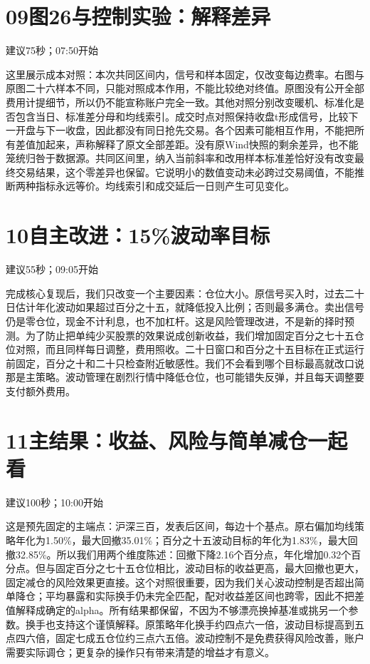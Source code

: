 \documentclass[UTF8,a4paper,11pt]{ctexart}
\begin{document}
\section*{\color{ink}09\quad 图26与控制实验：解释差异}
{\small\color{accent}建议75秒；07:50开始}\par
这里展示成本对照：本次共同区间内，信号和样本固定，仅改变每边费率。右图与原图二十六样本不同，只能对照成本作用，不能比较绝对终值。原图没有公开全部费用计提细节，所以仍不能宣称账户完全一致。其他对照分别改变暖机、标准化是否包含当日、标准差分母和均线索引。成交时点对照保持收盘t形成信号，比较下一开盘与下一收盘，因此都没有同日抢先交易。各个因素可能相互作用，不能把所有差值加起来，声称解释了原文全部差距。没有原Wind快照的剩余差异，也不能笼统归咎于数据源。共同区间里，纳入当前斜率和改用样本标准差恰好没有改变最终交易结果，这个零差异也保留。它说明小的数值变动未必跨过交易阈值，不能推断两种指标永远等价。均线索引和成交延后一日则产生可见变化。
\section*{\color{ink}10\quad 自主改进：15\%波动率目标}
{\small\color{accent}建议55秒；09:05开始}\par
完成核心复现后，我们只改变一个主要因素：仓位大小。原信号买入时，过去二十日估计年化波动如果超过百分之十五，就降低投入比例；否则最多满仓。卖出信号仍是零仓位，现金不计利息，也不加杠杆。这是风险管理改进，不是新的择时预测。为了防止把单纯少买股票的效果说成创新收益，我们增加固定百分之七十五仓位对照，而且同样每日调整，费用照收。二十日窗口和百分之十五目标在正式运行前固定，百分之十和二十只检查附近敏感性。我们不会看到哪个目标最高就改口说那是主策略。波动管理在剧烈行情中降低仓位，也可能错失反弹，并且每天调整要支付额外费用。
\newpage
\section*{\color{ink}11\quad 主结果：收益、风险与简单减仓一起看}
{\small\color{accent}建议100秒；10:00开始}\par
这是预先固定的主端点：沪深三百，发表后区间，每边十个基点。原右偏加均线策略年化为1.50\%，最大回撤35.01\%；百分之十五波动目标的年化为1.83\%，最大回撤32.85\%。所以我们用两个维度陈述：回撤下降2.16个百分点，年化增加0.32个百分点。但与固定百分之七十五仓位相比，波动目标的收益更高，最大回撤也更大，固定减仓的风险效果更直接。这个对照很重要，因为我们关心波动控制是否超出简单降仓；平均暴露和实际换手仍未完全匹配，配对收益差区间也跨零，因此不把差值解释成确定的alpha。所有结果都保留，不因为不够漂亮换掉基准或挑另一个参数。换手也支持这个谨慎解释。原策略年化换手约四点六一倍，波动目标提高到五点四六倍，固定七成五仓位约三点六五倍。波动控制不是免费获得风险改善，账户需要实际调仓；更复杂的操作只有带来清楚的增益才有意义。
\end{document}
